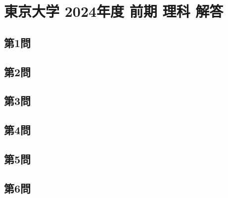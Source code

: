 ﻿\documentclass[../../uem_tok_a.tex]{subfiles}
\begin{document}
    \section{東京大学 2024年度 前期 理科 解答}

    \subsection{第1問}
    

    \clearpage
    \subsection{第2問}
    

    \clearpage
    \subsection{第3問}
    

    \clearpage
    \subsection{第4問}
    

    \clearpage
    \subsection{第5問}
    

    \clearpage
    \subsection{第6問}
    

    \clearpage
\end{document}
